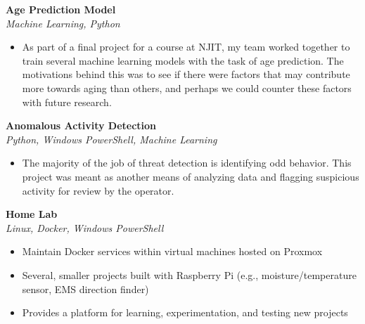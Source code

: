 \documentclass[a4paper]{article}
\begin{document}
            {\textbf{Age Prediction Model}}\\
            \textit{Machine Learning, Python}
            \vspace{-1mm}
            \begin{itemize} \itemsep 1pt
            
                    \item As part of a final project for a course at NJIT, my team worked together to train several machine learning models with the task of age prediction. The motivations behind this was to see if there were factors that may contribute more towards aging than others, and perhaps we could counter these factors with future research.
                
            \end{itemize}
            \vspace*{2mm}
            
            {\textbf{Anomalous Activity Detection}}\\
            \textit{Python, Windows PowerShell, Machine Learning}
            \vspace{-1mm}
            \begin{itemize} \itemsep 1pt
            
                    \item The majority of the job of threat detection is identifying odd behavior. This project was meant as another means of analyzing data and flagging suspicious activity for review by the operator.
                
            \end{itemize}
            \vspace*{2mm}
            
            {\textbf{Home Lab}}\\
            \textit{Linux, Docker, Windows PowerShell}
            \vspace{-1mm}
            \begin{itemize} \itemsep 1pt
            
                    \item Maintain Docker services within virtual machines hosted on Proxmox
                
                    \item Several, smaller projects built with Raspberry Pi (e.g., moisture/temperature sensor, EMS direction finder)
                
                    \item Provides a platform for learning, experimentation, and testing new projects
                
            \end{itemize}
            \vspace*{2mm}
            
\end{document}
